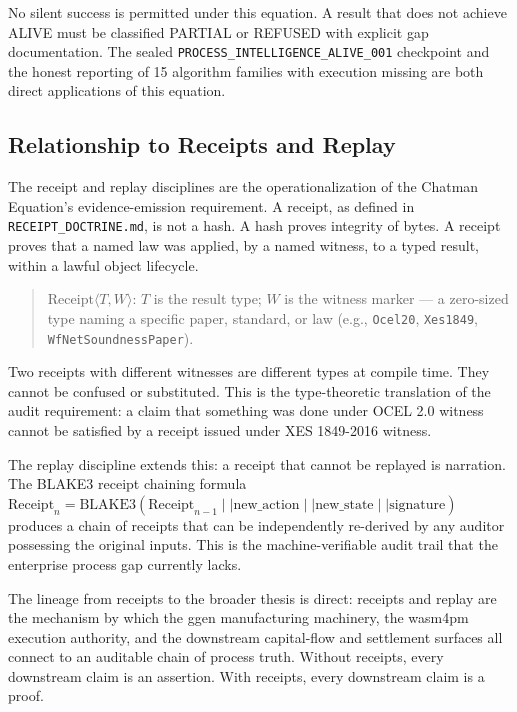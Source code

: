 No silent success is permitted under this equation. A result that does not achieve ALIVE must
be classified PARTIAL or REFUSED with explicit gap documentation. The sealed
\texttt{PROCESS\_INTELLIGENCE\_ALIVE\_001} checkpoint and the honest reporting of 15
algorithm families with execution missing are both direct applications of this equation.

\subsection{Relationship to Receipts and Replay}
\label{sec:doctrine-lineage-receipts}

The receipt and replay disciplines are the operationalization of the Chatman Equation's
evidence-emission requirement. A receipt, as defined in \texttt{RECEIPT\_DOCTRINE.md}, is
not a hash. A hash proves integrity of bytes. A receipt proves that a named law was applied,
by a named witness, to a typed result, within a lawful object lifecycle.

\begin{quote}
$\text{Receipt}\langle T, W\rangle$: $T$ is the result type; $W$ is the witness marker ---
a zero-sized type naming a specific paper, standard, or law (e.g., \texttt{Ocel20},
\texttt{Xes1849}, \texttt{WfNetSoundnessPaper}).
\end{quote}

Two receipts with different witnesses are different types at compile time. They cannot be
confused or substituted. This is the type-theoretic translation of the audit requirement:
a claim that something was done under OCEL 2.0 witness cannot be satisfied by a receipt
issued under XES 1849-2016 witness.

The replay discipline extends this: a receipt that cannot be replayed is narration. The
BLAKE3 receipt chaining formula $\text{Receipt}_n = \text{BLAKE3}(\text{Receipt}_{n-1}
\mid\mid \text{new\_action} \mid\mid \text{new\_state} \mid\mid \text{signature})$ produces
a chain of receipts that can be independently re-derived by any auditor possessing the
original inputs. This is the machine-verifiable audit trail that the enterprise process gap
currently lacks.

The lineage from receipts to the broader thesis is direct: receipts and replay are the
mechanism by which the ggen manufacturing machinery, the wasm4pm execution authority, and the
downstream capital-flow and settlement surfaces all connect to an auditable chain of process
truth. Without receipts, every downstream claim is an assertion. With receipts, every
downstream claim is a proof.
